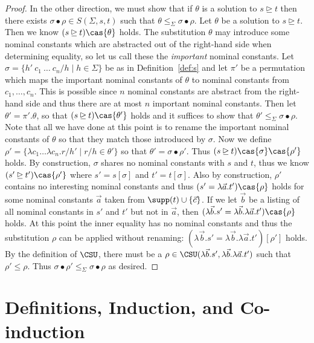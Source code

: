 \begin{proof}
In the other direction, we must show that if $\theta$ is a solution to $s
\unrhd t$ then there exists $\sigma\bullet\rho \in S(\Sigma, s, t)$
such that $\theta \le_\Sigma \sigma\bullet\rho$. Let $\theta$ be a
solution to $s\unrhd t$. Then we know $(s\unrhd t)\cas{\theta}$ holds.
The substitution $\theta$ may introduce some nominal constants which
are abstracted out of the right-hand side when determining equality, so
let us call these the {\em important} nominal constants. Let $\sigma =
\{h'\ c_1\ \ldots\ c_n/h \mid h \in \Sigma\}$ be as in
Definition~\ref{def:s} and let $\pi'$ be a permutation which maps the
important nominal constants of $\theta$ to nominal constants from
$c_1, \ldots, c_n$. This is possible since $n$ nominal constants are
abstract from the right-hand side and thus there are at most $n$
important nominal constants. Then let $\theta' = \pi'.\theta$, so that
$(s\unrhd t)\cas{\theta'}$ holds and it suffices to show that $\theta'
\le_\Sigma \sigma\bullet\rho$. Note that all we have done at this
point is to rename the important nominal constants of $\theta$ so that
they match those introduced by $\sigma$. Now we define $\rho' = \{
\lambda c_1\ldots\lambda c_n.r / h' \mid r / h \in \theta'\}$ so that
$\theta' = \sigma\bullet\rho'$. Thus $(s\unrhd
t)\cas{\sigma}\cas{\rho'}$ holds. By construction, $\sigma$ shares no
nominal constants with $s$ and $t$, thus we know $(s'\unrhd
t')\cas{\rho'}$ where $s' = s[\sigma]$ and $t' = t[\sigma]$. Also by
construction, $\rho'$ contains no interesting nominal constants and
thus $(s' = \lambda\vec{a}. t')\cas{\rho}$ holds for some nominal
constants $\vec{a}$ taken from $\supp(t) \cup \{\vec{c}\}$. If we let
$\vec{b}$ be a listing of all nominal constants in $s'$ and $t'$ but
not in $\vec{a}$, then $(\lambda\vec{b}. s' =
\lambda\vec{b}.\lambda\vec{a}. t')\cas{\rho}$ holds. At this point the inner
equality has no nominal constants and thus the substitution $\rho$ can
be applied without renaming: $(\lambda\vec{b}. s' =
\lambda\vec{b}.\lambda\vec{a}. t')[\rho']$ holds. By the definition of
$\CSU$, there must be a $\rho \in \CSU(\lambda\vec{b}.s',
\lambda\vec{b}.\lambda\vec{a}.t')$ such that $\rho' \le \rho$. Thus
$\sigma\bullet\rho' \le_\Sigma \sigma\bullet\rho$ as desired.
\end{proof}

\section{Definitions, Induction, and Co-induction}
\label{sec:definitions}

